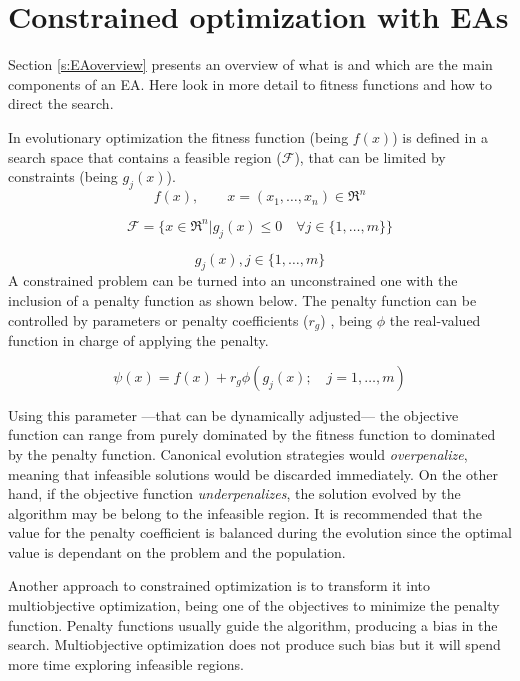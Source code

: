 \chapter{Constrained optimization with EAs}\label{ch:EA}

Section \ref{s:EAoverview} presents an overview of what is and which are the main components of an \acs{EA}. Here look in more detail to fitness functions and how to direct the search. 

In evolutionary optimization the fitness function (being $f(x)$) is defined in a search space that contains a feasible region ($\mathcal{F}$), that can be limited by constraints (being $g_j(x)$).
$$ f(x),\qquad x = (x_1,\ldots,x_n)\in \Re^n$$

$$ \mathcal{F} = \{x \in \Re^n | g_j(x) \le 0 \quad \forall j \in \{1,\ldots,m\}\} $$

$$ g_j(x), j \in \{1,\ldots, m\}$$
A constrained problem can be turned into an unconstrained one with the inclusion of a penalty function as shown below. The penalty function can be controlled by parameters or penalty coefficients ($r_g$) \cite{runarsson2000stochastic}, being $\phi$ the real-valued function in charge of applying the penalty. 

$$ \psi(x) = f(x) +r_g\phi(g_j(x); \quad j = 1,\ldots, m )$$

Using this parameter ---that can be dynamically adjusted--- the objective function can range from purely dominated by the fitness function to dominated by the penalty function. Canonical evolution strategies would \textit{overpenalize}, meaning that infeasible solutions would be discarded immediately. On the other hand, if the objective function \textit{underpenalizes}, the solution evolved by the algorithm may be belong to the infeasible region. It is recommended that the value for the penalty coefficient is balanced during the evolution since the optimal value is dependant on the problem and the population.

Another approach to constrained optimization is to transform it into multiobjective optimization\cite{runarsson2003evolutionary}, being one of the objectives to minimize the penalty function. Penalty functions usually guide the algorithm, producing a bias in the search. Multiobjective optimization does not produce such bias but it will spend more time exploring infeasible regions.



